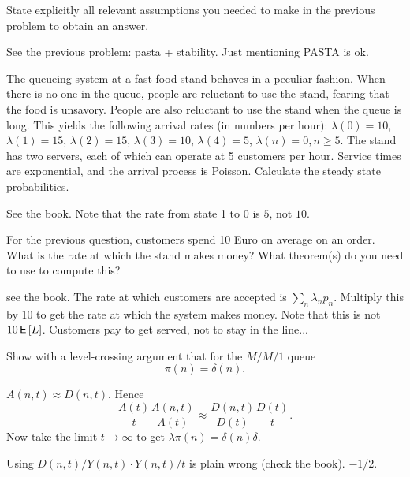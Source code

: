 \begin{exercise}[201706]
State explicitly all relevant assumptions you needed to make in the previous problem to obtain an answer.
\begin{solution}
  See the previous problem: pasta + stability. Just mentioning PASTA is ok. 
\end{solution}
\end{exercise}




\begin{exercise}[201706]
 The queueing system at a fast-food stand behaves in a
  peculiar fashion. When there is no one in the queue, people are
  reluctant to use the stand, fearing that the food is
  unsavory. People are also reluctant to use the stand when the queue
  is long. This yields the following arrival rates (in numbers per hour): $\lambda(0) = 10$, $\lambda(1)=15$, $\lambda(2)=15$, $\lambda(3)=10$, $\lambda(4)=5$, $\lambda(n)=0, n\geq 5$. The stand has two servers, each of which can operate at 5 customers per hour. Service times are exponential, and the arrival process is Poisson. 
 Calculate the steady state probabilities.
\begin{solution}
  See the book. Note that the rate from state 1 to 0 is $5$, not $10$. 
\end{solution}
\end{exercise}

\begin{exercise}[201706]
  For the previous question, customers spend 10 Euro on average on an order.
  What is the rate at which the stand makes money?
  What theorem(s) do you need to use to compute this?
\begin{solution}
see the book. 
    The rate at which customers are accepted is $\sum_{n} \lambda_n p_n$. Multiply this by 10 to get the rate at which the system makes money. Note that this is not $10 \,\mathsf{E}\left[L\right]$. Customers pay to get served, not to stay in the line...
\end{solution}
\end{exercise}


\begin{exercise}[201804] Show with a level-crossing argument  that for the $M/M/1$ queue 
  \begin{equation}\label{eq:91}
  \pi(n) = \delta(n).
  \end{equation}

\begin{solution}
    $A(n,t) \approx D(n,t)$. Hence
    \begin{equation*}
      \frac{A(t)}{t} \frac{A(n,t)}{A(t)} \approx 
      \frac{D(n, t)}{D(t)} \frac{D(t)}{t}.
    \end{equation*}
Now take the limit $t\to \infty$ to get $\lambda \pi(n) = \delta(n) \delta$. 

Using $D(n,t)/Y(n,t) \cdot Y(n,t)/t$ is plain wrong (check the book). $-1/2$. 
\end{solution}
\end{exercise}


